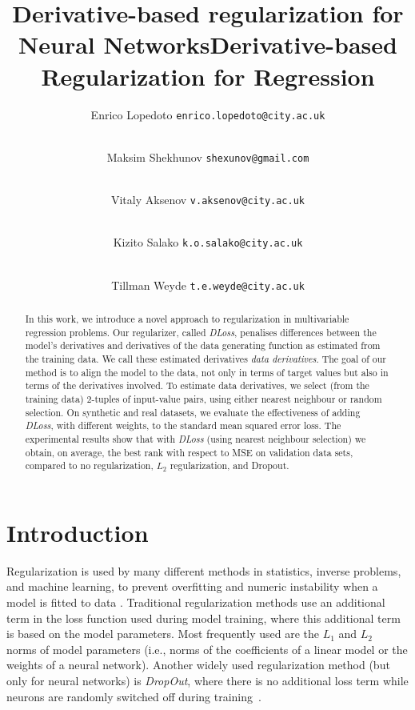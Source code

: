 \documentclass{article}
\title{Derivative-based regularization for Neural Networks}
\title{Derivative-based Regularization for Regression}
\author[1]{Enrico Lopedoto \texttt{enrico.lopedoto@city.ac.uk}}
\author[2]{\\Maksim Shekhunov  \texttt{shexunov@gmail.com}}
\author[1]{\\Vitaly Aksenov \texttt{v.aksenov@city.ac.uk}}
\author[1]{\\Kizito Salako \texttt{k.o.salako@city.ac.uk}}
\author[1]{\\Tillman Weyde \texttt{t.e.weyde@city.ac.uk}}
\affil[1]{Department of Computer Science\\
 City University London\\
 London, UK\\}
\affil[2]{Department of Computer Science\\
 ITMO University\\
 St Petersburg, Russian Federation}
\newcommand{\kibitz}[2]{\ifnum\Comments=1\textcolor{#1}{#2}\fi}
\newcommand{\kizito}[1]{\kibitz{red} {[Kizito: #1]}}
\newcommand{\enrico}[1]{\kibitz{blue} {[Enrico: #1]}}
\newcommand{\tillman}[1]{\kibitz{darkgreen} {[Tillman: #1]}}
\begin{document}
\maketitle

\begin{abstract}
In this work, we introduce a novel approach to regularization in multivariable regression problems. 
Our regularizer, called \emph{DLoss}, penalises differences between the model's derivatives and derivatives of the data generating function as estimated from the training data. 
We call these estimated derivatives \emph{data derivatives}. 
The goal of our method is to align the model to the data, not only in terms of target values but also in terms of the derivatives involved. 
To estimate data derivatives, we select (from the training data) 2-tuples of input-value pairs, using either nearest neighbour or random selection. 
On synthetic and real datasets, we evaluate the effectiveness of adding \emph{DLoss}, with different weights, to the standard mean squared error loss. 
The experimental results show that with \emph{DLoss} (using nearest neighbour selection) we obtain, on average, the best rank with respect to MSE on validation data sets, compared to no regularization, $L_2$ regularization, and Dropout.
\end{abstract}



\section{Introduction}
\label{introduction}

Regularization is used by many different methods in statistics, inverse problems, and machine learning, to prevent overfitting and numeric instability when a model is fitted to data \cite{Kukacka2017regsurvey}.
Traditional regularization methods use an additional term in the loss function used during model training, where this additional term is based on the model parameters. 
Most frequently used are the $L_1$ \cite{tibshirani1996L1} and $L_2$~\cite{TikhonovL2} norms of model parameters (i.e., norms of the coefficients of a linear model or the weights of a neural network). 
Another widely used regularization method (but only for neural networks) is \emph{DropOut}, where there is no additional loss term while neurons are randomly switched off during training~\cite{hinton2012L2,srivastava2014dropout}.
\end{document}

